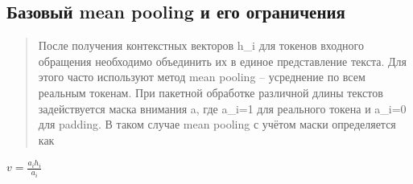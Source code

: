 \hypertarget{ux431ux430ux437ux43eux432ux44bux439-mean-pooling-ux438-ux435ux433ux43e-ux43eux433ux440ux430ux43dux438ux447ux435ux43dux438ux44f}{%
\subsection{Базовый mean pooling и его
ограничения}\label{ux431ux430ux437ux43eux432ux44bux439-mean-pooling-ux438-ux435ux433ux43e-ux43eux433ux440ux430ux43dux438ux447ux435ux43dux438ux44f}}

\begin{quote}
После получения контекстных векторов h\_i для токенов входного обращения
необходимо объединить их в единое представление текста. Для этого часто
используют метод mean pooling -- усреднение по всем реальным токенам.
При пакетной обработке различной длины текстов задействуется маска
внимания a, где a\_i=1 для реального токена и a\_i=0 для padding. В
таком случае mean pooling с учётом маски определяется как
\end{quote}

\(v = \frac{a_{i}h_{i}}{a_{i}}\)

